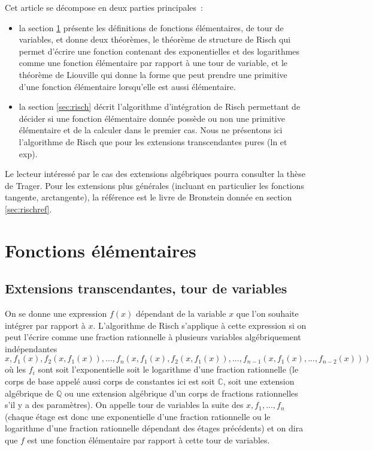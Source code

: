 \documentclass[a4paper,11pt]{book}
\begin{document}
\begin{giacjshere}
Cet article se décompose en deux parties principales~:
\begin{itemize}
\item la section \ref{sec:elem} présente les définitions de fonctions
élémentaires, de tour de variables, et donne deux théorèmes,
le théorème de structure de Risch qui permet d'écrire une fonction 
contenant des exponentielles et des logarithmes comme une fonction 
élémentaire par rapport à une tour de variable, et 
le théorème de Liouville qui donne la forme que peut prendre
une primitive d'une fonction élémentaire lorsqu'elle est aussi élémentaire.
\item la section \ref{sec:risch} décrit l'algorithme d'intégration de Risch
permettant de décider si une fonction élémentaire donnée possède
ou non une primitive élémentaire et de la calculer dans le premier
cas. Nous ne présentons ici l'algorithme de Risch que pour les extensions
transcendantes pures (ln et exp).
\end{itemize}
Le lecteur intéressé par le cas des extensions algébriques 
pourra consulter la thèse de Trager. Pour les extensions
plus g\'en\'erales (incluant en particulier les fonctions
tangente, arctangente), la r\'ef\'erence est le livre de Bronstein 
donnée en section \ref{sec:rischref}.

\section{Fonctions élémentaires} \label{sec:elem}

\subsection{Extensions transcendantes, tour de variables}
On se donne une expression $f(x)$ dépendant de la variable $x$ que l'on 
souhaite intégrer par rapport à $x$. L'algorithme de Risch s'applique à
cette expression si on peut l'écrire comme une fraction rationnelle à
plusieurs variables algébriquement indépendantes
\[ x, f_1(x), f_2(x,f_1(x)), ..., 
f_n(x,f_1(x),f_2(x,f_1(x)),...,f_{n-1}(x,f_1(x),...,f_{n-2}(x))) \]
où les $f_i$ sont soit l'exponentielle soit le logarithme d'une fraction
rationnelle (le corps de base appelé aussi corps de
constantes ici est soit $\mathbb{C}$, soit une extension algébrique de $\mathbb{Q}$ ou une
extension algébrique d'un corps de fractions rationnelles s'il
y a des paramètres). 
On appelle tour de variables
la suite des $x,f_1,...,f_n$ (chaque étage est donc une exponentielle
d'une fraction rationnelle ou le logarithme d'une fraction rationnelle
dépendant des étages précédents) 
et on dira que $f$ est une fonction élémentaire
par rapport à cette tour de variables.


\end{giacjshere}
\end{document}
